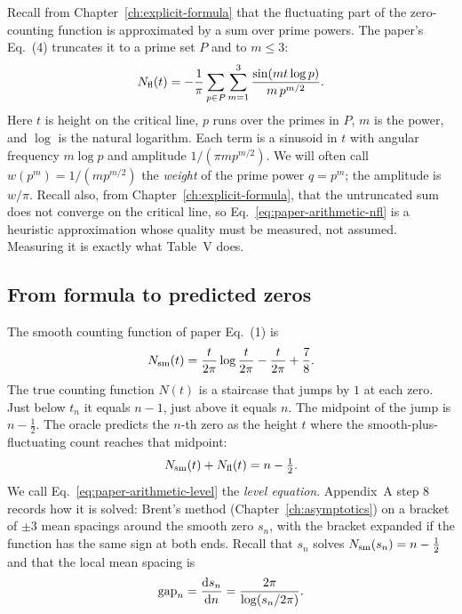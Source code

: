 Recall from Chapter~\ref{ch:explicit-formula} that the fluctuating part of the zero-counting function is approximated by a sum over prime powers. The paper's Eq.~(4) truncates it to a prime set $P$ and to $m\le3$:
\begin{equation}
N_{\mathrm{fl}}(t) = -\frac{1}{\pi}\sum_{p\in P}\sum_{m=1}^{3}\frac{\sin(m t\log p)}{m\,p^{m/2}} .
\label{eq:paper-arithmetic-nfl}
\end{equation}
Here $t$ is height on the critical line, $p$ runs over the primes in $P$, $m$ is the power, and $\log$ is the natural logarithm. Each term is a sinusoid in $t$ with angular frequency $m\log p$ and amplitude $1/(\pi m p^{m/2})$. We will often call $w(p^m)=1/(m p^{m/2})$ the \emph{weight} of the prime power $q=p^m$; the amplitude is $w/\pi$. Recall also, from Chapter~\ref{ch:explicit-formula}, that the untruncated sum does not converge on the critical line, so Eq.~\eqref{eq:paper-arithmetic-nfl} is a heuristic approximation whose quality must be measured, not assumed. Measuring it is exactly what Table~V does.

\subsection{From formula to predicted zeros}

The smooth counting function of paper Eq.~(1) is
\begin{equation}
N_{\mathrm{sm}}(t)=\frac{t}{2\pi}\log\frac{t}{2\pi}-\frac{t}{2\pi}+\frac78 .
\label{eq:paper-arithmetic-nsm}
\end{equation}
The true counting function $N(t)$ is a staircase that jumps by $1$ at each zero. Just below $t_n$ it equals $n-1$, just above it equals $n$. The midpoint of the jump is $n-\tfrac12$. The oracle predicts the $n$-th zero as the height $t$ where the smooth-plus-fluctuating count reaches that midpoint:
\begin{equation}
N_{\mathrm{sm}}(t)+N_{\mathrm{fl}}(t) = n-\tfrac12 .
\label{eq:paper-arithmetic-level}
\end{equation}
We call Eq.~\eqref{eq:paper-arithmetic-level} the \emph{level equation}. Appendix~A step 8 records how it is solved: Brent's method (Chapter~\ref{ch:asymptotics}) on a bracket of $\pm3$ mean spacings around the smooth zero $s_n$, with the bracket expanded if the function has the same sign at both ends. Recall that $s_n$ solves $N_{\mathrm{sm}}(s_n)=n-\tfrac12$ and that the local mean spacing is
\begin{equation}
\mathrm{gap}_n = \frac{\mathrm{d} s_n}{\mathrm{d} n} = \frac{2\pi}{\log(s_n/2\pi)} .
\label{eq:paper-arithmetic-gap}
\end{equation}

